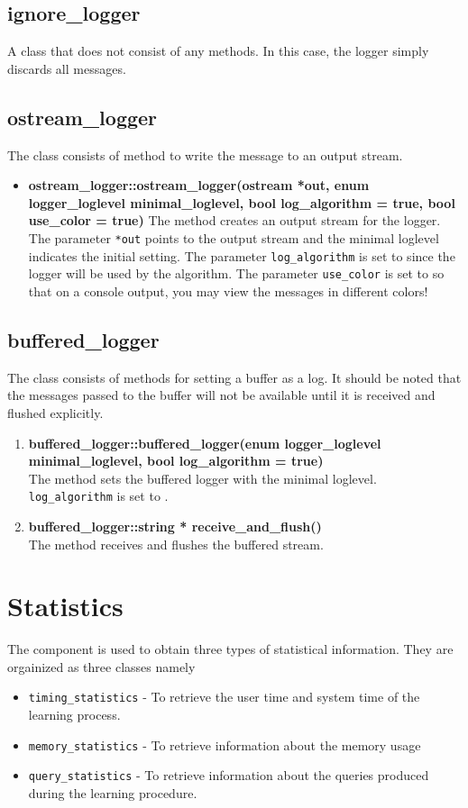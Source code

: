 \subsection*{ignore\_logger}
A class that does not consist of any methods. In this case, the logger simply discards all messages.

\subsection*{ostream\_logger}
The class consists of method to write the message to an output stream. 
\begin{itemize}
 \item \textbf{ostream\_logger::ostream\_logger(ostream *out, enum logger\_loglevel minimal\_loglevel, bool log\_algorithm = true, bool use\_color = true)} \vskip 1pt
	The method creates an output stream for the logger. The parameter \texttt{*out} points to the output stream and the minimal loglevel indicates the initial setting. The parameter \texttt{log\_algorithm} is set to \true since the logger will be used by the algorithm. The parameter \texttt{use\_color} is set to \true so that on a console output, you may view the messages in different colors!
\end{itemize}

\subsection*{buffered\_logger}
The class consists of methods for setting a buffer as a log. It should be noted that the messages passed to the buffer will not be available until it is received and flushed explicitly.

\begin{enumerate}
 \item \textbf{buffered\_logger::buffered\_logger(enum logger\_loglevel minimal\_loglevel, bool log\_algorithm = true)} \\
	The method sets the buffered logger with the minimal loglevel. \texttt{log\_algorithm} is set to \true.
 \item \textbf{buffered\_logger::string * receive\_and\_flush()} \\
	The method receives and flushes the buffered stream.
\end{enumerate}

\section{Statistics}
The component is used to obtain three types of statistical information. They are orgainized as three classes namely 
\begin{itemize}
\item \texttt{timing\_statistics} - To retrieve the user time and system time of the learning process.
\item \texttt{memory\_statistics} - To retrieve information about the memory usage
\item \texttt{query\_statistics} - To retrieve information about the queries produced during the learning procedure.
\end{itemize}

